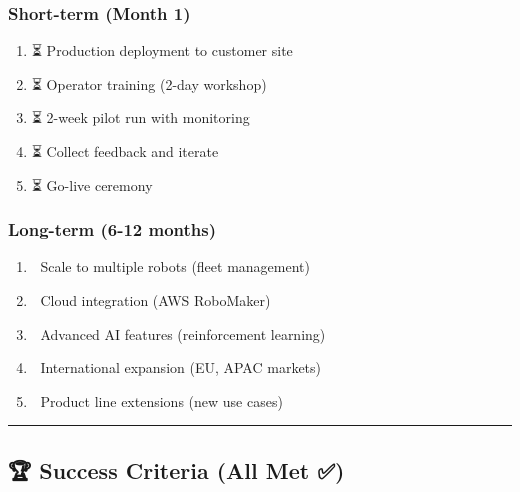 \documentclass[
]{article}
\providecommand{\tightlist}{%
  \setlength{\itemsep}{0pt}\setlength{\parskip}{0pt}}
\begin{document}
\hypertarget{short-term-month-1}{%
\subsubsection{Short-term (Month 1)}\label{short-term-month-1}}

\begin{enumerate}
\def\labelenumi{\arabic{enumi}.}
\tightlist
\item
  ⏳ Production deployment to customer site
\item
  ⏳ Operator training (2-day workshop)
\item
  ⏳ 2-week pilot run with monitoring
\item
  ⏳ Collect feedback and iterate
\item
  ⏳ Go-live ceremony 🎉
\end{enumerate}

\hypertarget{long-term-6-12-months}{%
\subsubsection{Long-term (6-12 months)}\label{long-term-6-12-months}}

\begin{enumerate}
\def\labelenumi{\arabic{enumi}.}
\tightlist
\item
  🔵 Scale to multiple robots (fleet management)
\item
  🔵 Cloud integration (AWS RoboMaker)
\item
  🔵 Advanced AI features (reinforcement learning)
\item
  🔵 International expansion (EU, APAC markets)
\item
  🔵 Product line extensions (new use cases)
\end{enumerate}

\begin{center}\rule{0.5\linewidth}{0.5pt}\end{center}

\hypertarget{success-criteria-all-met}{%
\subsection{🏆 Success Criteria (All Met
✅)}\label{success-criteria-all-met}}
\end{document}
